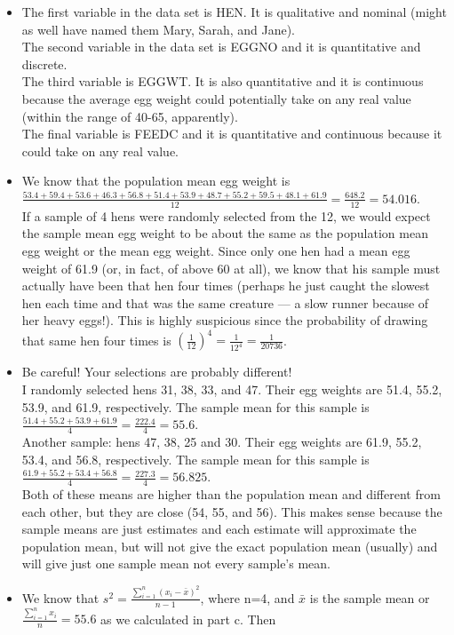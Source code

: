 \documentclass[12pt]{article}
\begin{document}
\begin{enumerate}
\begin{itemize}
\item[a.] The ﬁrst variable in the data set is HEN. It is qualitative and nominal (might as well have named them Mary, Sarah, and Jane). \\
The second variable in the data set is EGGNO and it is quantitative and discrete. \\
The third variable is EGGWT. It is also quantitative and it is continuous because the average egg weight could potentially take on any real value (within the range of 40-65, apparently).\\
The ﬁnal variable is FEEDC and it is quantitative and continuous because it could take on any real value.
\item[b.] We know that the population mean egg weight is $\frac{53.4+59.4+53.6+46.3+56.8+51.4+53.9+48.7+55.2+59.5+48.1+61.9}{12}=\frac{648.2}{12}=54.016$. \\
 If a sample of 4 hens were randomly selected from the 12, we would expect the sample mean egg weight to be about the same as the population mean egg weight or the mean egg weight. Since only one hen had a mean egg weight of 61.9 (or, in fact, of above 60 at all), we know that his sample must actually have been that hen four times (perhaps he just caught the slowest hen each time and that was the same creature — a slow runner because of her heavy eggs!). This is highly suspicious since the probability of drawing that same hen four times is $\left(\frac{1}{12}\right)^4=\frac{1}{12^4}=\frac{1}{20736}$.
 \item[c.] Be careful! Your selections are probably different!\\
 I randomly selected hens 31, 38, 33, and 47. Their egg weights are 51.4, 55.2, 53.9, and 61.9, respectively. The sample mean for this sample is $\frac{51.4+55.2+53.9+61.9}{4}=\frac{222.4}{4}=55.6$.\\
 Another sample: hens 47, 38, 25 and 30. Their egg weights are 61.9, 55.2, 53.4, and 56.8, respectively. The sample mean for this sample is $\frac{61.9 + 55.2 + 53.4 + 56.8}{4}=\frac{227.3}{4}=56.825$.\\
 Both of these means are higher than the population mean and different from each other, but they are close (54, 55, and 56). This makes sense because the sample means are just estimates and each estimate will approximate the population mean, but will not give the exact population mean (usually) and will give just one sample mean not every sample's mean.
 \item[d.] We know that $s^2=\frac{\textstyle \sum_{i=1}^n (x_i-\bar{x})^2}{n-1}$, where n=4, and $\bar{x}$ is the sample mean or $\frac{\sum_{i=1}^n x_i}{n}=55.6$ as we calculated in part c. Then\\

\end{itemize}
\end{enumerate}
\end{document}
